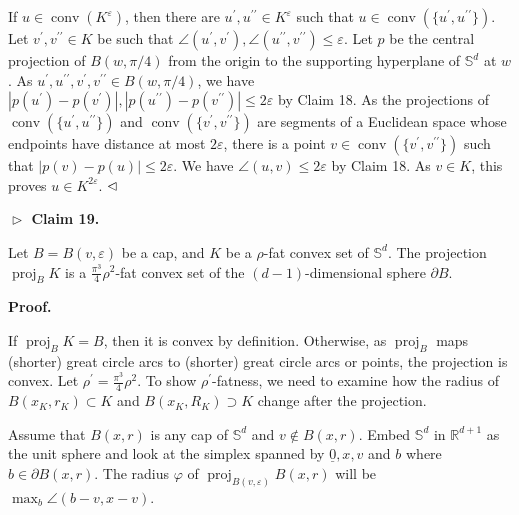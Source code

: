 \documentclass[10pt,a4paper]{amsart}
\begin{document}
If $u\in\operatorname{conv}(K^{\varepsilon})$, then there are $u^{\prime},u^{\prime\prime}\in K^{\varepsilon}$ such that $u\in\operatorname{conv}(\{u^{\prime},u^{\prime\prime}\})$. Let $v^{\prime},v^{\prime\prime}\in K$ be such that $\angle(u^{\prime},v^{\prime}),\angle(u^{\prime\prime},v^{\prime\prime})\leq\varepsilon$. Let $p$ be the central projection of $B(w,\pi/4)$ from the origin to the supporting hyperplane of $\mathbb{S}^{d}$ at $w$. As $u^{\prime},u^{\prime\prime},v^{\prime},v^{\prime\prime}\in B(w,\pi/4)$, we have $|p(u^{\prime})-p(v^{\prime})|,|p(u^{\prime\prime})-p(v^{\prime\prime})|\leq 2\varepsilon$ by Claim 18. As the projections of $\operatorname{conv}(\{u^{\prime},u^{\prime\prime}\})$ and $\operatorname{conv}(\{v^{\prime},v^{\prime\prime}\})$ are segments of a Euclidean space whose endpoints have distance at most $2\varepsilon$, there is a point $v\in\operatorname{conv}(\{v^{\prime},v^{\prime\prime}\})$ such that $|p(v)-p(u)|\leq 2\varepsilon$. We have $\angle(u,v)\leq 2\varepsilon$ by Claim 18. As $v\in K$, this proves $u\in K^{2\varepsilon}$. $\hfill\vartriangleleft$
\par
\par
\par\medskip\noindent\textbf{$\vartriangleright$ Claim 19.}\par
Let $B=B(v,\varepsilon)$ be a cap, and $K$ be a $\rho$-fat convex set of $\mathbb{S}^{d}$. The projection $\operatorname{proj}_{B}K$ is a $\frac{\pi^{3}}{4}\rho^{2}$-fat convex set of the $(d-1)$-dimensional sphere $\partial B$.
\par
\par
\par
\par
\par\medskip\noindent\textbf{Proof.}\par
If $\operatorname{proj}_{B}K=B$, then it is convex by definition. Otherwise, as $\operatorname{proj}_{B}$ maps (shorter) great circle arcs to (shorter) great circle arcs or points, the projection is convex. Let $\rho^{\prime}=\frac{\pi^{3}}{4}\rho^{2}$. To show $\rho^{\prime}$-fatness, we need to examine how the radius of $B(x_{K},r_{K})\subset K$ and $B(x_{K},R_{K})\supset K$ change after the projection.
\par
\par
Assume that $B(x,r)$ is any cap of $\mathbb{S}^{d}$ and $v\not\in B(x,r)$. Embed $\mathbb{S}^{d}$ in $\mathbb{R}^{d+1}$ as the unit sphere and look at the simplex spanned by $\underline{0},x,v$ and $b$ where $b\in\partial B(x,r)$. The radius $\varphi$ of $\operatorname{proj}_{B(v,\varepsilon)}B(x,r)$ will be $\max_{b}\angle(b-v,x-v)$.
\end{document}
